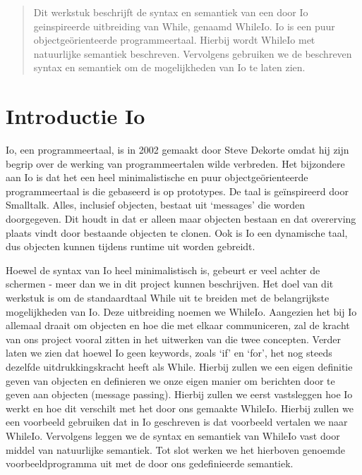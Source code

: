 \documentclass[12pt]{article}
\begin{document}
\maketitle

\begin{abstract}
Dit werkstuk beschrijft de syntax en semantiek van een door Io geinspireerde uitbreiding van While, genaamd WhileIo. Io is een puur objectge\"orienteerde programmeertaal. Hierbij wordt WhileIo met natuurlijke semantiek beschreven. Vervolgens gebruiken we de beschreven syntax en semantiek om
de mogelijkheden van Io te laten zien.
\end{abstract}

\section{Introductie Io}
Io, een programmeertaal, is in 2002 gemaakt door Steve Dekorte omdat hij zijn begrip over de werking van programmeertalen wilde verbreden.
Het bijzondere aan Io is dat het een heel minimalistische en puur objectge\"orienteerde programmeertaal is die gebaseerd is op prototypes. De taal is ge\"inspireerd door Smalltalk. Alles, inclusief objecten, bestaat uit `messages' die worden doorgegeven.
Dit houdt in dat er alleen maar objecten bestaan en dat overerving plaats vindt door bestaande objecten te clonen.
Ook is Io een dynamische taal, dus objecten kunnen tijdens runtime uit worden gebreidt.

Hoewel de syntax van Io heel minimalistisch is, gebeurt er veel achter de schermen - meer dan we in dit project kunnen beschrijven.
Het doel van dit werkstuk is om de standaardtaal While uit te breiden met de belangrijkste mogelijkheden van Io.
Deze uitbreiding noemen we WhileIo.
Aangezien het bij Io allemaal draait om objecten en hoe die met elkaar communiceren, zal de kracht van ons project vooral zitten in het uitwerken van die twee concepten.
Verder laten we zien dat hoewel Io geen keywords, zoals `if' en `for', het nog steeds dezelfde uitdrukkingskracht heeft als While. %
Hierbij zullen we een eigen definitie geven van objecten en definieren we onze eigen manier om berichten door te geven aan objecten (message passing).
Hierbij zullen we eerst vastsleggen hoe Io werkt en hoe dit verschilt met het door ons gemaakte WhileIo.
Hierbij zullen we een voorbeeld gebruiken dat in Io geschreven is dat voorbeeld vertalen we naar WhileIo.
Vervolgens leggen we de syntax en semantiek van WhileIo vast door middel van natuurlijke semantiek.
Tot slot werken we het hierboven genoemde voorbeeldprogramma uit met de door ons gedefinieerde semantiek. 
\end{document}
